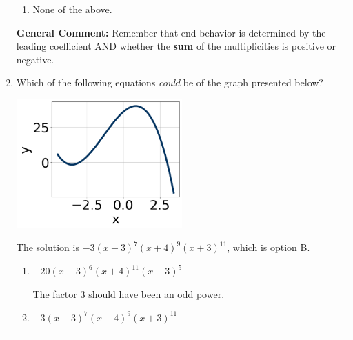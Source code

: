 \documentclass{extbook}[14pt]
\newcommand{\litem}[1]{\item #1

\rule{\textwidth}{0.4pt}}
\begin{document}
\begin{enumerate}
{\begin{enumerate}[label=\Alph*.]
\item None of the above.\end{enumerate}
\textbf{General Comment:} Remember that end behavior is determined by the leading coefficient AND whether the \textbf{sum} of the multiplicities is positive or negative.
}
\litem{
Which of the following equations \textit{could} be of the graph presented below?

\begin{center}
    \includegraphics[width=0.5\textwidth]{../Figures/polyGraphToFunctionB.png}
\end{center}


The solution is \( -3(x - 3)^{7} (x + 4)^{9} (x + 3)^{11} \), which is option B.\begin{enumerate}[label=\Alph*.]
\item \( -20(x - 3)^{6} (x + 4)^{11} (x + 3)^{5} \)

The factor $3$ should have been an odd power.
\item \( -3(x - 3)^{7} (x + 4)^{9} (x + 3)^{11} \)


\end{enumerate}}
\end{enumerate}
\end{document}
